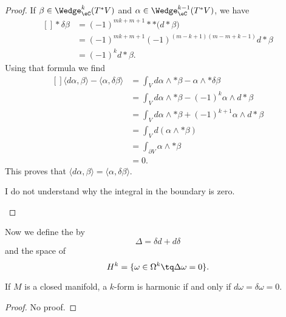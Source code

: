 \begin{proof}
	If $\beta\in\Wedge_{\eC}^k(T^*V)$ and $\alpha\in\Wedge_{\eC}^{k-1}(T^*V)$, we have
	\begin{equation}
		\begin{aligned}[]
			*\delta\beta&=(-1)^{mk+m+1}* *\big( d*\beta \big)\\
			&=(-1)^{mk+m+1}(-1)^{(m-k+1)(m-m+k-1)}d*\beta\\
			&=(-1)^kd*\beta.
		\end{aligned}
	\end{equation}
	Using that formula we find
	\begin{equation}
		\begin{aligned}[]
			\langle d\alpha, \beta\rangle -\langle \alpha, \delta\beta\rangle &=\int_V d\alpha\wedge *\beta-\alpha\wedge *\delta\beta\\
			&=\int_Vd\alpha\wedge *\beta-(-1)^k\alpha\wedge d*\beta\\
			&=\int_Vd\alpha\wedge *\beta+(-1)^{k+1}\alpha\wedge d*\beta\\
			&=\int_Vd(\alpha\wedge *\beta)\\
			&=\int_{\partial V}\alpha\wedge *\beta\\
			&=0.
		\end{aligned}
	\end{equation}
	This proves that $\langle d\alpha, \beta\rangle =\langle \alpha, \delta\beta\rangle$.
	\begin{probleme}
		I do not understand why the integral in the boundary is zero. 
	\end{probleme}	
\end{proof}

Now we define the  by
\begin{equation}
	\Delta=\delta d+d\delta
\end{equation}
and the space of 
\begin{equation}
	H^k=\{ \omega\in\Omega^k\tq\Delta\omega=0 \}.
\end{equation}

\begin{lemma}
	If $M$ is a closed manifold, a $k$-form is harmonic if and only if $d\omega=\delta\omega=0$.
\end{lemma}

\begin{proof}
	No proof.
\end{proof}

